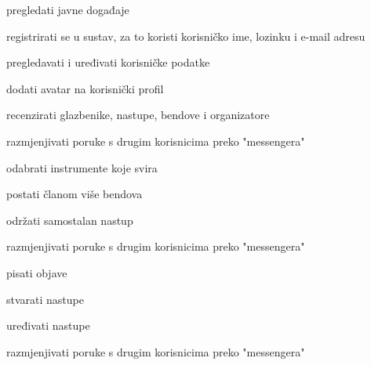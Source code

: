 			
			\begin{packed_enum}
			
			
			\item  {}
			
			\begin{packed_enum}
				\item pregledati javne događaje
				\item registrirati se u sustav, za to koristi korisničko ime, lozinku i e-mail adresu
			
			\end{packed_enum}
		
		\item  {}
		
		\begin{packed_enum}
			
			\item pregledavati i uređivati korisničke podatke
			\item dodati avatar na korisnički profil
			\item recenzirati glazbenike, nastupe, bendove i organizatore
			\item razmjenjivati poruke s drugim korisnicima preko "messengera"
			
		\end{packed_enum}
	
	

\item  {}

\begin{packed_enum}
	
	\item odabrati instrumente koje svira
	\item postati članom više bendova
	\item održati samostalan nastup
	\item razmjenjivati poruke s drugim korisnicima preko "messengera"
	\item pisati objave
\end{packed_enum}

\item  {}

\begin{packed_enum}
	
	\item stvarati nastupe
	\item uređivati nastupe
	\item razmjenjivati poruke s drugim korisnicima preko "messengera"
\end{packed_enum}


\end{packed_enum}
